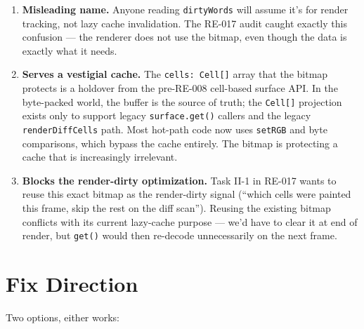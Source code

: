 \begin{enumerate}
\def\labelenumi{\arabic{enumi}.}
\item
  \textbf{Misleading name.} Anyone reading \texttt{d\allowbreak{}i\allowbreak{}r\allowbreak{}t\allowbreak{}y\allowbreak{}W\allowbreak{}o\allowbreak{}r\allowbreak{}d\allowbreak{}s} will assume it's for render tracking, not lazy cache invalidation. The RE-017 audit caught exactly this confusion --- the renderer does not use the bitmap, even though the data is exactly what it needs.
\item
  \textbf{Serves a vestigial cache.} The \texttt{c\allowbreak{}e\allowbreak{}l\allowbreak{}l\allowbreak{}s\allowbreak{}:\allowbreak{} \allowbreak{}C\allowbreak{}e\allowbreak{}l\allowbreak{}l\allowbreak{}[\allowbreak{}]} array that the bitmap protects is a holdover from the pre-RE-008 cell-based surface API. In the byte-packed world, the buffer is the source of truth; the \texttt{C\allowbreak{}e\allowbreak{}l\allowbreak{}l\allowbreak{}[\allowbreak{}]} projection exists only to support legacy \texttt{s\allowbreak{}u\allowbreak{}r\allowbreak{}f\allowbreak{}a\allowbreak{}c\allowbreak{}e\allowbreak{}.\allowbreak{}g\allowbreak{}e\allowbreak{}t\allowbreak{}(\allowbreak{})} callers and the legacy \texttt{r\allowbreak{}e\allowbreak{}n\allowbreak{}d\allowbreak{}e\allowbreak{}r\allowbreak{}D\allowbreak{}i\allowbreak{}f\allowbreak{}f\allowbreak{}C\allowbreak{}e\allowbreak{}l\allowbreak{}l\allowbreak{}s} path. Most hot-path code now uses \texttt{s\allowbreak{}e\allowbreak{}t\allowbreak{}R\allowbreak{}G\allowbreak{}B} and byte comparisons, which bypass the cache entirely. The bitmap is protecting a cache that is increasingly irrelevant.
\item
  \textbf{Blocks the render-dirty optimization.} Task II-1 in RE-017 wants to reuse this exact bitmap as the render-dirty signal (``which cells were painted this frame, skip the rest on the diff scan''). Reusing the existing bitmap conflicts with its current lazy-cache purpose --- we'd have to clear it at end of render, but \texttt{g\allowbreak{}e\allowbreak{}t\allowbreak{}(\allowbreak{})} would then re-decode unnecessarily on the next frame.
\end{enumerate}

\section{Fix Direction}\label{record-368-fix-direction}

Two options, either works:

